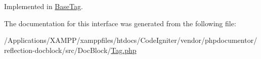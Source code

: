 Implemented in \mbox{\hyperlink{classphp_documentor_1_1_reflection_1_1_doc_block_1_1_tags_1_1_base_tag_ac20fbfe3216d76776b5e743bd16427f9}{Base\+Tag}}.



The documentation for this interface was generated from the following file\+:\begin{DoxyCompactItemize}
\item 
/\+Applications/\+X\+A\+M\+P\+P/xamppfiles/htdocs/\+Code\+Igniter/vendor/phpdocumentor/reflection-\/docblock/src/\+Doc\+Block/\mbox{\hyperlink{_tag_8php}{Tag.\+php}}\end{DoxyCompactItemize}
